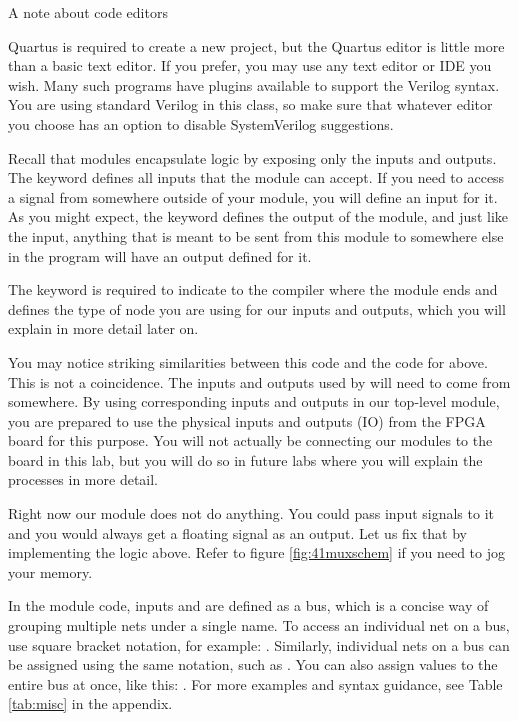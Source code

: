 \documentclass[12pt]{labmanual}
\begin{document}
\begin{aside}[0.3,0.7]{A note about code editors}
\begin{rightcontent}
       Quartus is required to create a new project, but the Quartus editor is little more than a basic text editor. If you prefer, you may use any text editor or IDE you wish. Many such programs have plugins available to support the Verilog syntax. You are using standard Verilog in this class, so make sure that whatever editor you choose has an option to disable SystemVerilog suggestions. 
\end{rightcontent}
\begin{leftcontent}
    Recall that modules encapsulate logic by exposing only the inputs and outputs. The keyword  defines all inputs that the module can accept. If you need to access a signal from somewhere outside of your module, you will define an input for it. As you might expect, the keyword  defines the output of the module, and just like the input, anything that is meant to be sent from this module to somewhere else in the program will have an output defined for it.
\end{leftcontent}
\end{aside}
  The keyword  is required to indicate to the compiler where the module ends and  defines the type of node you are using for our inputs and outputs, which you will explain in more detail later on.
\begin{extra}
You may notice striking similarities between this code and the code for  above. This is not a coincidence. The inputs and outputs used by  will need to come from somewhere. By using corresponding inputs and outputs in our top-level module, you are prepared to use the physical inputs and outputs (IO) from the FPGA board for this purpose. You will not actually be connecting our modules to the board in this lab, but you will do so in future labs where you will explain the processes in more detail.
\end{extra}

Right now our module does not do anything. You could pass input signals to it and you would always get a floating signal as an output. Let us fix that by implementing the logic above. Refer to figure \vref{fig:41muxschem} if you need to jog your memory.
\clearpage

\begin{extra}
    In the module code, inputs  and  are defined as a bus, which is a concise way of grouping multiple nets under a single name. To access an individual net on a bus, use square bracket notation, for example: . Similarly, individual nets on a bus can be assigned using the same notation, such as . You can also assign values to the entire bus at once, like this: . For more examples and syntax guidance, see Table \ref{tab:misc} in the appendix.
\end{extra}
\end{document}
